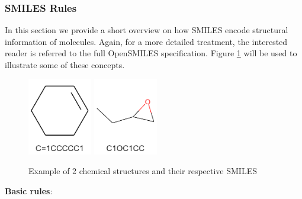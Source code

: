     \subsubsection{SMILES Rules \label{rules}}
    In this section we provide a short overview on how SMILES encode structural information of molecules. Again, for a more detailed treatment, the interested reader is referred to the full OpenSMILES specification. Figure \ref{fig:smile-examples} will be used to illustrate some of these concepts.
    
        \begin{figure}[htb]
        \centering
        \includegraphics[width=0.25\textwidth]{figures/Smiles-Smile1.png}
        \includegraphics[width=0.25\textwidth]{figures/Smiles-Smile2.png}
        \caption{Example of 2 chemical structures and their respective SMILES}
        \label{fig:smile-examples}
    \end{figure}

    {\bf Basic rules}: 
    
